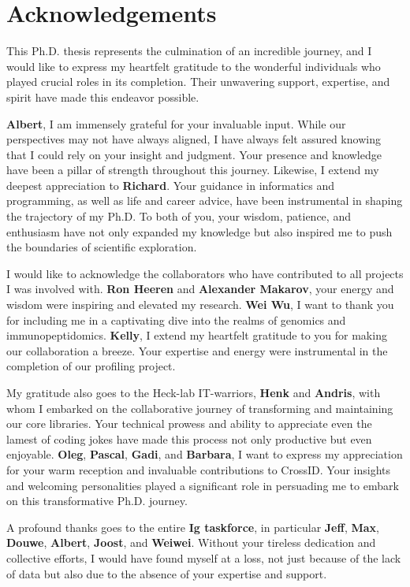 \section{Acknowledgements}

This Ph.D. thesis represents the culmination of an incredible journey, and I would like to express my heartfelt gratitude to the wonderful individuals who played crucial roles in its completion. Their unwavering support, expertise, and spirit have made this endeavor possible.

\textbf{Albert}, I am immensely grateful for your invaluable input. While our perspectives may not have always aligned, I have always felt assured knowing that I could rely on your insight and judgment. Your presence and knowledge have been a pillar of strength throughout this journey. Likewise, I extend my deepest appreciation to \textbf{Richard}. Your guidance in informatics and programming, as well as life and career advice, have been instrumental in shaping the trajectory of my Ph.D. To both of you, your wisdom, patience, and enthusiasm have not only expanded my knowledge but also inspired me to push the boundaries of scientific exploration.

I would like to acknowledge the collaborators who have contributed to all projects I was involved with. \textbf{Ron Heeren} and \textbf{Alexander Makarov}, your energy and wisdom were inspiring and elevated my research. \textbf{Wei Wu}, I want to thank you for including me in a captivating dive into the realms of genomics and immunopeptidomics. \textbf{Kelly}, I extend my heartfelt gratitude to you for making our collaboration a breeze. Your expertise and energy were instrumental in the completion of our profiling project.

My gratitude also goes to the Heck-lab IT-warriors, \textbf{Henk} and \textbf{Andris}, with whom I embarked on the collaborative journey of transforming and maintaining our core libraries. Your technical prowess and ability to appreciate even the lamest of coding jokes have made this process not only productive but even enjoyable. \textbf{Oleg}, \textbf{Pascal}, \textbf{Gadi}, and \textbf{Barbara}, I want to express my appreciation for your warm reception and invaluable contributions to CrossID. Your insights and welcoming personalities played a significant role in persuading me to embark on this transformative Ph.D. journey.

A profound thanks goes to the entire \textbf{Ig taskforce}, in particular \textbf{Jeff}, \textbf{Max}, \textbf{Douwe}, \textbf{Albert}, \textbf{Joost}, and \textbf{Weiwei}. Without your tireless dedication and collective efforts, I would have found myself at a loss, not just because of the lack of data but also due to the absence of your expertise and support.

